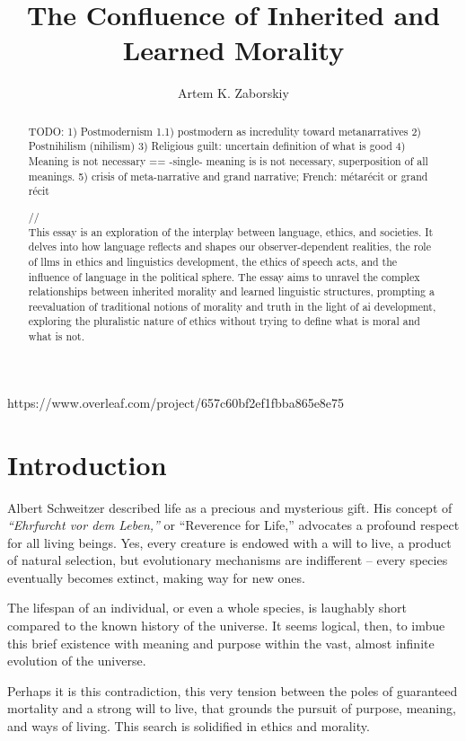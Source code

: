 \documentclass[11pt,a4]{article}
\begin{document}
\title{The Confluence of Inherited and Learned Morality}

\author{Artem K. Zaborskiy }


\maketitle

https://www.overleaf.com/project/657c60bf2ef1fbba865e8e75

\begin{abstract}

TODO:
1) Postmodernism
1.1) postmodern as incredulity toward metanarratives
2) Postnihilism (nihilism)
3) Religious guilt: uncertain definition of what is good
4) Meaning is not necessary == -single- meaning is is not necessary, superposition of all meanings.
5) crisis of meta-narrative and grand narrative; French: métarécit or grand récit

//
\\
This essay is an exploration of the interplay between language, ethics, and societies. It delves into how language reflects and shapes our observer-dependent realities, the role of \ac{llms} in ethics and linguistics development, the ethics of speech acts, and the influence of language in the political sphere. The essay aims to unravel the complex relationships between inherited morality and learned linguistic structures, prompting a reevaluation of traditional notions of morality and truth in the light of \ac{ai} development, exploring the pluralistic nature of ethics without trying to define what is moral and what is not.
\end{abstract}

\tableofcontents
\printacronyms




\section{Introduction}

    Albert Schweitzer described life as a precious and mysterious gift\cite{Schweitzer}. His concept of \textit{“Ehrfurcht vor dem Leben,”} or “Reverence for Life,” advocates a profound respect for all living beings. Yes, every creature is endowed with a will to live, a product of natural selection, but evolutionary mechanisms are indifferent – every species eventually becomes extinct, making way for new ones.
    \par
    The lifespan of an individual, or even a whole species, is laughably short compared to the known history of the universe. It seems logical, then, to imbue this brief existence with meaning and purpose within the vast, almost infinite evolution of the universe.
    \par
    Perhaps it is this contradiction, this very tension between the poles of guaranteed mortality and a strong will to live, that grounds the pursuit of purpose, meaning, and ways of living. This search is solidified in ethics and morality.
\end{document}
